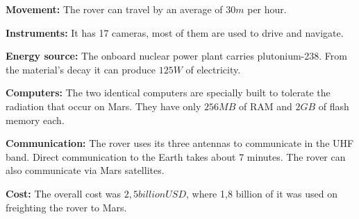 \begin{tcolorbox}[colback=red!5,colframe=DarkRed!40!black,title=Mars \& Curiosity: The Red Planet and the rover]
\textbf{Movement:} The rover can travel by an average of $30 m$ per hour.

\textbf{Instruments:} It has 17 cameras, most of them are used to drive and navigate.

\textbf{Energy source:} The onboard nuclear power plant carries plutonium-238.
From the material's decay it can produce $125 W$ of electricity.

\textbf{Computers:} The two identical computers are specially built to tolerate the radiation that occur on Mars.
They have only $256 MB$ of RAM and $2 GB$ of flash memory each.

\textbf{Communication:} The rover uses its three antennas to communicate in the UHF band.
Direct communication to the Earth takes about 7 minutes.
The rover can also communicate via Mars satellites.

\textbf{Cost:} The overall cost was $2,5 billion USD$, where 1,8 billion of it was used on freighting the rover to Mars.
\end{tcolorbox}